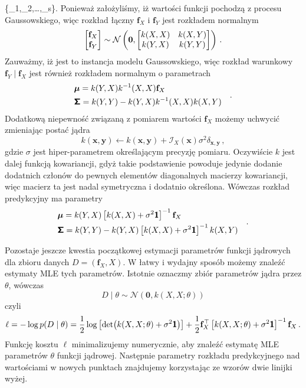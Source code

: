 \documentclass{myclass}
\begin{document}
\{_1,_2,\ldots,_s\}\). Ponieważ założyliśmy, iż wartości funkcji
pochodzą z procesu Gaussowskiego, więc rozkład łączny \(\mathbf{f}_X\) i \(\mathbf{f}_Y\) jest
rozkładem normalnym
\begin{equation*}
    \mqty[\mathbf{f}_X \\ \mathbf{f}_Y] \sim \mathcal{N}\left(\mathbf{0}, \mqty[k(X,X) & k(X,Y) \\ k(Y,X) & k(Y,Y)]\right)\,.
\end{equation*}
Zauważmy, iż jest to instancja modelu Gaussowskiego, więc rozkład warunkowy \(\mathbf{f}_Y\mid
\mathbf{f}_X\) jest również rozkładem normalnym o parametrach
\begin{equation*}
    \begin{split}
        &\boldsymbol{\mu} = k(Y,X)k^{-1}(X,X)\mathbf{f}_X\\
        &\boldsymbol{\mathsf{\Sigma}} = k(Y,Y) - k(Y,X)k^{-1}(X,X)k(X,Y)
    \end{split}\quad.
\end{equation*}
Dodatkową niepewność związaną z pomiarem wartości \(\mathbf{f}_X\) możemy uchwycić zmieniając postać
jądra 
\begin{equation*}
    k(\mathbf{x},\mathbf{y}) \leftarrow k(\mathbf{x},\mathbf{y}) + \mathcal{I}_X(\mathbf{x})\sigma^2\delta_{\mathbf{x},\mathbf{y}}\,,
\end{equation*}
gdzie \(\sigma\) jest hiper-parametrem określającym precyzję pomiaru. Oczywiście \(k\) jest dalej
funkcją kowariancji, gdyż takie podstawienie powoduje jedynie dodanie dodatnich członów do pewnych
elementów diagonalnych macierzy kowariancji, więc macierz ta jest nadal symetryczna i dodatnio
określona. Wówczas rozkład predykcyjny ma parametry
\begin{equation*}
    \begin{split}
        &\boldsymbol{\mu} = k(Y,X)\left[k(X,X) + \sigma^2\boldsymbol{\mathsf{1}}\right]^{-1}\mathbf{f}_X\\
        &\boldsymbol{\mathsf{\Sigma}} = k(Y,Y) - k(Y,X)\left[k(X,X) + \sigma^2\boldsymbol{\mathsf{1}}\right]^{-1}k(X,Y)
    \end{split}\quad.
\end{equation*}

Pozostaje jeszcze kwestia początkowej estymacji parametrów funkcji jądrowych dla zbioru danych \(D =
(\mathbf{f}_X, X)\). W łatwy i wydajny sposób możemy znaleźć estymaty MLE tych parametrów. Istotnie
oznaczmy zbiór parametrów jądra przez \(\theta\), wówczas
\begin{equation*}
    D \mid \theta \sim \mathcal{N}(\mathbf{0}, k(X,X; \theta))
\end{equation*}
czyli
\begin{equation*}
    \ell = -\log p(D \mid \theta) = \frac{1}{2}\log\left[\det (k(X,X;\theta)+\sigma^2\boldsymbol{\mathsf{1}})\right] + \frac{1}{2}\mathbf{f}_X^\top\left[k(X,X;\theta) + \sigma^2\boldsymbol{\mathsf{1}}\right]^{-1}\mathbf{f}_X\,.
\end{equation*}
Funkcję kosztu \(\ell\) minimalizujemy numerycznie, aby znaleźć estymatę MLE parametrów \(\theta\)
funkcji jądrowej. Następnie parametry rozkładu predykcyjnego nad wartościami w nowych punktach
znajdujemy korzystając ze wzorów dwie linijki wyżej.
\end{document}
